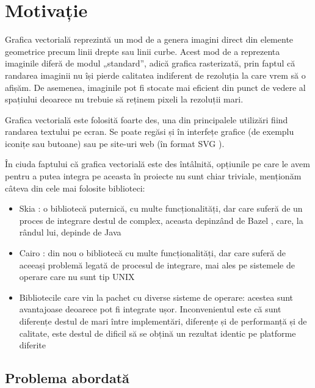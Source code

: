 \documentclass[a4paper, 12pt]{report}
\begin{document}
\makeatother

\tableofcontents

\chapter{Motivație}

Grafica vectorială \cite{vector_graphics_wikipedia} reprezintă un mod de a genera imagini
direct din elemente geometrice precum linii drepte sau linii curbe. Acest mod de a reprezenta
imaginile diferă de modul „standard”, adică grafica rasterizată, prin faptul că randarea imaginii
nu își pierde calitatea indiferent de rezoluția la care vrem să o afișăm. De asemenea, imaginile
pot fi stocate mai eficient din punct de vedere al spațiului deoarece nu trebuie să reținem pixeli
la rezoluții mari.

Grafica vectorială este folosită foarte des, una din principalele utilizări fiind randarea textului
pe ecran. Se poate regăsi și în interfețe grafice (de exemplu iconițe sau butoane) sau pe site-uri
web (în format SVG \cite{svg_standard}).

În ciuda faptului că grafica vectorială este des întâlnită, opțiunile pe care le avem pentru a putea
integra pe aceasta în proiecte nu sunt chiar triviale, menționăm câteva din cele mai folosite biblioteci:
\begin{itemize}
    \item{Skia \cite{skia_library}: o bibliotecă puternică, cu multe funcționalități, dar care suferă
        de un proces de integrare destul de complex, aceasta depinzând de Bazel \cite{bazel_build_system},
        care, la rândul lui, depinde de Java \cite{java_programming_language}}
    \item{Cairo \cite{cairo_library}: din nou o bibliotecă cu multe funcționalități, dar care suferă de aceeași
        problemă legată de procesul de integrare, mai ales pe sistemele de operare care nu sunt tip UNIX \cite{unix}}
    \item{Bibliotecile care vin la pachet cu diverse sisteme de operare: acestea sunt avantajoase deoarece pot fi
        integrate ușor. Inconvenientul este că sunt diferențe destul de mari între implementări, diferențe și de
        performanță și de calitate, este destul de dificil să se obțină un rezultat identic pe platforme diferite}
\end{itemize}

\section{Problema abordată}
\end{document}
